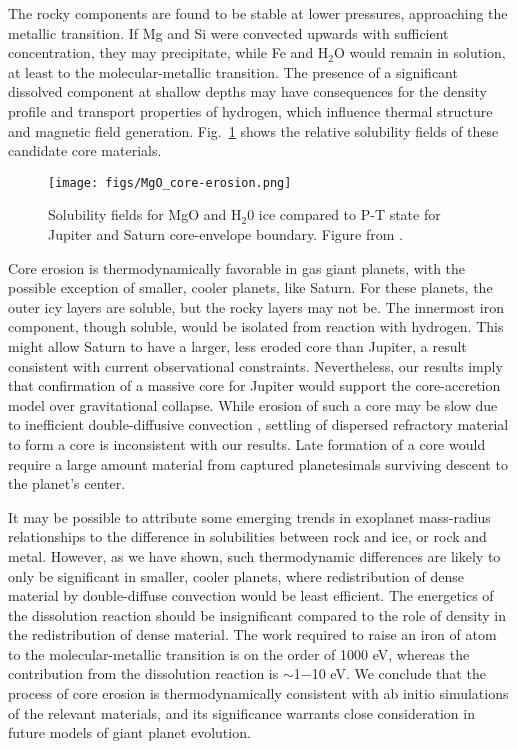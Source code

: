 The rocky components are found to be stable at lower pressures, approaching the
metallic transition. If Mg and Si were convected upwards with sufficient
concentration, they may precipitate, while Fe and $\mathrm{H}_2\mathrm{O}$
would remain in solution, at least to the molecular-metallic transition.  The
presence of a significant dissolved component at shallow depths may have
consequences for the density profile and transport properties of hydrogen,
which influence thermal structure and magnetic field generation.
Fig.~\ref{fig:mgoerosion} shows the relative solubility fields of these
candidate core materials.

 \begin{figure}[!h] %
   \centering
   \texttt{[image: figs/MgO\_core-erosion.png]} 
\caption{ Solubility fields for MgO and H$_2$0 ice compared to P-T state for Jupiter and Saturn
    core-envelope boundary. Figure from \citet{wilson12b}.\label{fig:mgoerosion}}
\end{figure}

Core erosion is thermodynamically favorable in gas giant planets,
with the possible exception of smaller, cooler planets, like Saturn. For these planets, the
outer icy layers are soluble, but the rocky layers may not be. The innermost
iron component, though soluble, would be isolated from reaction with hydrogen.
This might allow Saturn to have a larger, less eroded core than
Jupiter, a result consistent with current observational constraints.
Nevertheless, our results imply
that confirmation of a massive core for Jupiter would support the
core-accretion model over gravitational collapse. While erosion of such a core
may be slow due to inefficient double-diffusive convection
\citep{stevenson82a,chabrier07,leconte12,mirouh12}, settling of dispersed
refractory material to form a core is inconsistent with our results. Late formation of a core
would require a large amount material from captured planetesimals
surviving descent to the planet's center.

It may be possible to attribute some
emerging trends in exoplanet mass-radius relationships to the difference in
solubilities between rock and ice, or rock and metal. However, as we have
shown, such thermodynamic differences are likely to only be significant in
smaller, cooler planets, where redistribution of dense material by
double-diffuse convection would be least efficient. The energetics of the
dissolution reaction should be insignificant compared to the role of density
in the redistribution of dense material. The work required to raise an iron of atom to
the molecular-metallic transition is on the order of 1000 eV, whereas the
contribution from the dissolution reaction is $\sim$1$-$10 eV. We conclude
that the process of core erosion is thermodynamically consistent with ab
initio simulations of the relevant materials, and its
significance warrants close consideration in future models of giant planet
evolution.




